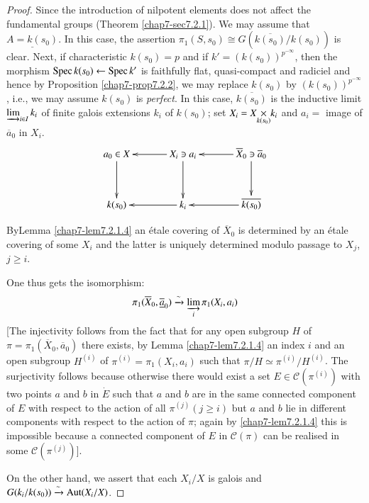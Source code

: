 \begin{proof}
Since the introduction of nilpotent elements does not affect the
fundamental groups (Theorem \ref{chap7-sec7.2.1}). We may assume that
$\underline{A=k(s_{0})}$. In this case, the assertion
$\pi_{1}(S,s_{0})\cong G(\overline{k(s_{0})}/k(s_{0}))$ is
clear. Next, if characteristic $k(s_{0})=p$ and if
$k'=(k(s_{0}))^{p^{-\infty}}$, then the morphism $\operatorname{Spec}
k(s_{0})\leftarrow \operatorname{Spec} k'$ is faithfully flat, quasi-compact and
radiciel and hence by Proposition \ref{chap7-prop7.2.2}, we may replace
$k(s_{0})$ by $(k(s_{0}))^{p^{-\infty}}$, i.e., we may assume
$k(s_{0})$ is {\em perfect}. In this case, $\overline{k(s_{0})}$ is
the inductive limit $\varinjlim_{i\in I}k_{i}$ of finite galois
extensions $k_{i}$ of $k(s_{0})$; set
$X_{i}=\fprod{X}{k_{i}}{k(s_{0})}$ and $a_{i}=$ image of
$\overline{a}_{0}$ in $X_{i}$. 
\[
\xymatrix@=1.2cm{
a_{0}\in X\ar[d] & X_{i}\ni a_{i}\ar[l]\ar[d] & \overline{X}_{0}\ni
\overline{a}_{0}\ar[d]\ar[l]\\
k(s_{0}) & k_{i}\ar[l] & \overline{k(s_{0})}\ar[l]
}
\] 

By\pageoriginale Lemma \ref{chap7-lem7.2.1.4} an \'etale covering of
$\overline{X}_{0}$ is 
determined by an \'etale covering of some $X_{i}$ and the latter is
uniquely determined modulo passage to $X_{j}$, $j\geq i$.

One thus gets the isomorphism:
$$
\pi_{1}(\overline{X}_{0},\overline{\underline{a}}_{0})\xrightarrow{\sim}
\varinjlim_{i}\pi_{1}(X_{i},a_{i}) 
$$
[The injectivity follows from the fact that for any open subgroup $H$
  of $\pi=\pi_{1}(\overline{X}_{0},\overline{a}_{0})$ there exists, by
  Lemma \ref{chap7-lem7.2.1.4} an index $i$ and an open subgroup $H^{(i)}$
  of $\pi^{(i)}=\pi_{1}(X_{i},a_{i})$ such that $\pi/H\simeq
  \pi^{(i)}/H^{(i)}$. The surjectivity follows because otherwise there
  would exist a set $E\in\mathscr{C}(\pi^{(i)})$ with two points $a$
  and $b$ in $\dot{E}$ such that $a$ and $b$ are in the same connected
  component of $E$ with respect to the action of all $\pi^{(j)}(j\geq
  i)$ but $a$ and $b$ lie in different components with respect to the
  action of $\pi$; again by \ref{chap7-lem7.2.1.4} this is impossible because
  a connected component of $E$ in $\mathscr{C}(\pi)$ can be realised
  in some $\mathscr{C}(\pi^{(j)})$].

On the other hand, we assert that each $X_{i}/X$ is galois and
$G(k_{i}/k(s_{0}))\break \xrightarrow{\sim}\Aut (X_{i}/X)$. 


\end{proof}
